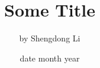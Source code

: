 \documentclass[12pt]{article}
\begin{document}
\title{Some Title}
\author{by Shengdong Li}
\date{date month year}
\maketitle

\begin{align}
\end{align}
\end{document}
